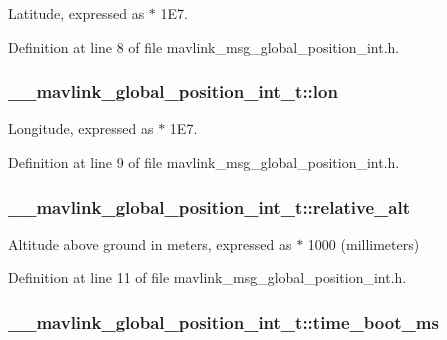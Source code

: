 Latitude, expressed as $\ast$ 1\-E7. 



Definition at line 8 of file mavlink\-\_\-msg\-\_\-global\-\_\-position\-\_\-int.\-h.

\hypertarget{struct____mavlink__global__position__int__t_a2350bdf8af429bc2ed49b7cfac61cee7}{
\subsubsection[{lon}]{ \-\_\-\-\_\-mavlink\-\_\-global\-\_\-position\-\_\-int\-\_\-t\-::lon}}\label{struct____mavlink__global__position__int__t_a2350bdf8af429bc2ed49b7cfac61cee7}


Longitude, expressed as $\ast$ 1\-E7. 



Definition at line 9 of file mavlink\-\_\-msg\-\_\-global\-\_\-position\-\_\-int.\-h.

\hypertarget{struct____mavlink__global__position__int__t_a1b3d36234adcacbedc88c37c1712f4b1}{
\subsubsection[{relative\-\_\-alt}]{ \-\_\-\-\_\-mavlink\-\_\-global\-\_\-position\-\_\-int\-\_\-t\-::relative\-\_\-alt}}\label{struct____mavlink__global__position__int__t_a1b3d36234adcacbedc88c37c1712f4b1}


Altitude above ground in meters, expressed as $\ast$ 1000 (millimeters) 



Definition at line 11 of file mavlink\-\_\-msg\-\_\-global\-\_\-position\-\_\-int.\-h.

\hypertarget{struct____mavlink__global__position__int__t_a1b56c431f19cff6fadc2b0ac3b5959b6}{
\subsubsection[{time\-\_\-boot\-\_\-ms}]{ \-\_\-\-\_\-mavlink\-\_\-global\-\_\-position\-\_\-int\-\_\-t\-::time\-\_\-boot\-\_\-ms}}\label{struct____mavlink__global__position__int__t_a1b56c431f19cff6fadc2b0ac3b5959b6}


